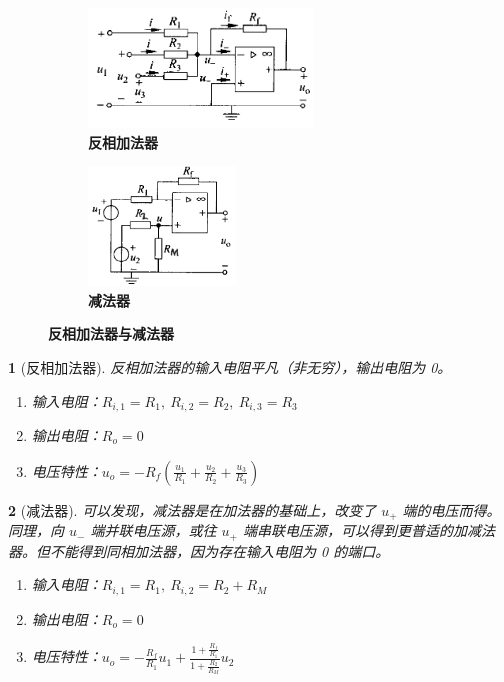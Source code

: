 \documentclass[UTF8]{report}
\theoremstyle{MyLineTheoremStyle} %
\theoremstyle{MyBlockTheoremStyle} %
\theoremstyle{MySubsubsectionStyle} %
\newtheorem{definition}{}
\begin{document}
\begin{figure}[H]\centering
    \begin{subfigure}[t]{0.37\textwidth}\centering
        \includegraphics[height=90pt]{assets/1,2/反相加法器.png}
        \caption{\bfseries 反相加法器}
    \end{subfigure}\begin{subfigure}[t]{0.37\textwidth}\centering
        \includegraphics[height=90pt]{assets/1,2/减法器.png}
        \caption{\bfseries 减法器}
    \end{subfigure}
    \caption{\bfseries 反相加法器与减法器}
\end{figure}


\begin{definition}[反相加法器]
反相加法器的输入电阻平凡（非无穷），输出电阻为 0。
\begin{enumerate}
\item 输入电阻：$R_{i,1} = R_1,\ R_{i,2} = R_2,\ R_{i,3} = R_3$
\item 输出电阻：$R_o = 0$
\item 电压特性：$u_o = - R_f\left( \frac{u_1}{R_1} + \frac{u_2}{R_2} + \frac{u_3}{R_3} \right) $
\end{enumerate}
\end{definition}


\begin{definition}[减法器]
可以发现，减法器是在加法器的基础上，改变了 $u_+$ 端的电压而得。同理，向 $u_-$ 端并联电压源，或往 $u_+$ 端串联电压源，可以得到更普适的加减法器。但不能得到同相加法器，因为存在输入电阻为 0 的端口。
\begin{enumerate}
\item 输入电阻：$R_{i,1} = R_1,\ R_{i,2} = R_2 + R_M$
\item 输出电阻：$R_o = 0$
\item 电压特性：$u_o = -\frac{R_f}{R_1}u_1 + \frac{1+\frac{R_f}{R_1}}{1+\frac{R_2}{R_M}}u_2 $
\end{enumerate}
\end{definition}
\end{document}
